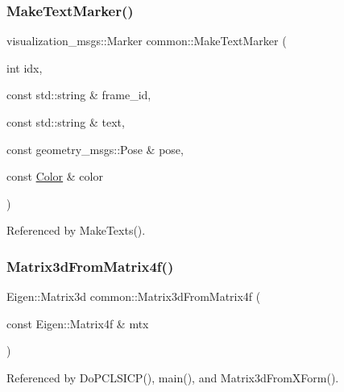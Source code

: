 \mbox{\label{namespacecommon_a8f52e7ee9db9db31ef41df1566c08b2e}} 
\subsubsection{\texorpdfstring{Make\+Text\+Marker()}{MakeTextMarker()}}
{\footnotesize\ttfamily visualization\+\_\+msgs\+::\+Marker common\+::\+Make\+Text\+Marker (\begin{DoxyParamCaption}\item[{int}]{idx,  }\item[{const std\+::string \&}]{frame\+\_\+id,  }\item[{const std\+::string \&}]{text,  }\item[{const geometry\+\_\+msgs\+::\+Pose \&}]{pose,  }\item[{const \hyperlink{namespacecommon_a325f61d2a1dcd20782fbb1421c0c3631}{Color} \&}]{color }\end{DoxyParamCaption})}



Referenced by Make\+Texts().

\mbox{\label{namespacecommon_a12010389a8f6bfb72230dbe65eb60ff2}} 
\subsubsection{\texorpdfstring{Matrix3d\+From\+Matrix4f()}{Matrix3dFromMatrix4f()}}
{\footnotesize\ttfamily Eigen\+::\+Matrix3d common\+::\+Matrix3d\+From\+Matrix4f (\begin{DoxyParamCaption}\item[{const Eigen\+::\+Matrix4f \&}]{mtx }\end{DoxyParamCaption})}



Referenced by Do\+P\+C\+L\+S\+I\+C\+P(), main(), and Matrix3d\+From\+X\+Form().

\mbox{\label{namespacecommon_abd161a56797ce1d90331acbf3d441d90}} 
